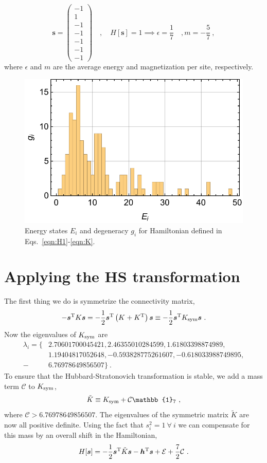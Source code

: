 \documentclass[11pt]{article}
\begin{document}
\begin{equation}
\bm s=\begin{pmatrix}
-1\\ 1\\ -1\\ -1\\ -1\\ -1\\ -1
\end{pmatrix}\quad,\quad H[\bm s]=1\implies \epsilon = \frac{1}{7}\quad, m = -\frac{5}{7}\ ,
\end{equation}
where $\epsilon$ and $m$ are the average energy and magnetization per site, respectively. 
\begin{figure}
\center
\includegraphics[width=.8\columnwidth]{figures/histogram.pdf}
\caption{Energy states $E_i$ and degeneracy $g_i$ for Hamiltonian defined in Eqs.~\eqref{eqn:H1}-\eqref{eqn:K}.\label{fig:histogram}}
\end{figure}

\section{Applying the HS transformation}
The first thing we do is symmetrize the connectivity matrix, 
\begin{equation}
-\bm s^{\rm T}K\bm s =-\frac{1}{2}\bm s^{\rm T}\left(K^{}+K^{\rm T}\right)\bm s\equiv-\frac{1}{2}\bm s^{\rm T}K_{\rm sym}\bm s\ .
\end{equation}
Now the eigenvalues of $K_{\rm sym}$ are
\begin{align*}
\lambda_i = \{&2.70601700045421, 2.46355010284599, 1.61803398874989, \\
&1.19404817052648, -0.593828775261607, -0.618033988749895,\\ 
-&6.76978649856507\}\ .
\end{align*}
To ensure that the Hubbard-Stratonovich transformation is stable, we add a mass term $\mathcal{C}$ to $K_{\rm sym}$,
\begin{equation}
\tilde K \equiv K_{\rm sym}+\mathcal{C}\mathbb{1}_7\ ,
\end{equation}
where $\mathcal{C}> 6.76978649856507$.  The eigenvalues of the symmetric matrix $\tilde K$ are now all positive definite.  Using the fact that $s_i^2=1\ \forall\  i$ we can compensate for this mass by an overall shift in the Hamiltonian,
\begin{equation}
H[\bm s]=-\frac{1}{2}\bm s^{\rm T}\tilde K\bm s-\bm h^{\rm T}\bm s+\mathcal{E}+\frac{7}{2}\mathcal{C}\ .
\end{equation}
\end{document}
